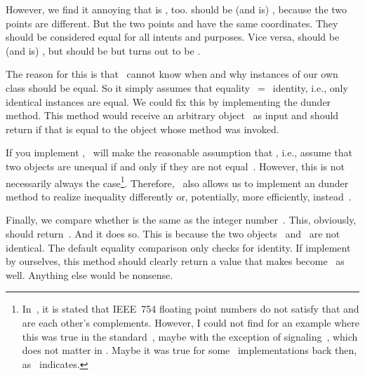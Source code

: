 However, we find it annoying that \pythonIdx{==} is , too.
 should be (and is) , because the two points are different.
But the two points  and  have the same coordinates.
They should be considered equal for all intents and purposes.
Vice versa,  should be (and is) , but  should be  but turns out to be .

The reason for this is that \python\ cannot know when and why instances of our own class should be equal.
So it simply assumes that equality~$=$~identity, i.e., only identical instances are equal.
We could fix this by implementing the  dunder method.
This method would receive an arbitrary object~ as input and should return  if that is equal to the object whose method was invoked.

If you implement , \python\ will make the reasonable assumption that \pythonIdx{==}, i.e., assume that two objects are unequal if and only if they are not equal~\cite{PEP207}.
However, this is not necessarily always the case\footnote{%
In~\cite{PEP207}, it is stated that IEEE~754 floating point numbers do not satisfy that \pythonilIdx{==} and \pythonil{!=} are each other's complements. %
However, I could not find for an example where this was true in the standard~\cite{IEEE2019ISFFPA}, maybe with the exception of signaling~, which does not matter in \python. %
Maybe it was true for some \python\ implementations back then, as~\cite{PEP754} indicates.%
}. %
Therefore, \python\ also allows us to implement an  dunder method to realize inequality differently or, potentially, more efficiently, instead~\cite{PEP207}.

Finally, we compare whether  is the same as the integer number~.
This, obviously, should return~.
And it does so.
This is because the two objects~ and~ are not identical.
The default equality comparison only checks for identity.
If implement  by ourselves, this method should clearly return a value that makes  become~ as well.
Anything else would be nonsense.

%
%
%

